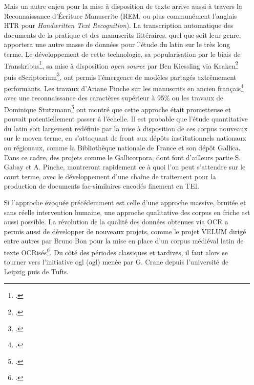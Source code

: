 Mais un autre enjeu pour la mise à disposition de texte arrive aussi à travers la Reconnaissance d'Écriture Manuscrite (REM, ou plus communément l'anglais HTR pour \textit{Handwritten Text Recognition}). La transcription automatique des documents de la pratique et des manuscrits littéraires, quel que soit leur genre, apportera une autre masse de données pour l'étude du latin sur le très long terme. Le développement de cette technologie, sa popularisation par le biais de Transkribus\footcite{kahle2017transkribus}, sa mise à disposition \textit{open source} par Ben Kiessling via Kraken\footcite{kiessling2019kraken} puis eScriptorium\footcite{kiessling_escripto}, ont permis l'émergence de modèles partagés extrêmement performants. Les travaux d'Ariane Pinche sur les manuscrits en ancien français\footcite{Pinche_CREMMA_Medieval_an_2021} avec une reconnaissance des caractères supérieur à 95\% ou les travaux de Dominique Stutzmann\footcite{hazem2020books} ont montré que cette approche était prometteuse et pouvait potentiellement passer à l'échelle. Il est probable que l'étude quantitative du latin soit largement redéfinie par la mise à disposition de ces corpus nouveaux sur le moyen terme, en s'attaquant de front aux dépôts institutionnels nationaux ou régionaux, comme la Bibliothèque nationale de France et son dépôt Gallica. Dans ce cadre, des projets comme le Gallicorpora, dont font d'ailleurs partie S. Gabay et A. Pinche, montreront rapidement ce à quoi l'on peut s'attendre sur le court terme, avec le développement d'une chaîne de traitement pour la production de documents fac-similaires encodés finement en TEI.

Si l'approche évoquée précédemment est celle d'une approche massive, bruitée et sans réelle intervention humaine, une approche qualitative des corpus en friche est aussi possible. La révolution de la qualité des données obtenues via OCR a permis aussi de développer de nouveaux projets, comme le projet VELUM dirigé entre autres par Bruno Bon pour la mise en place d'un corpus médiéval latin de texte OCRisés\footcite{bon2019challenges}. Du côté des périodes classiques et tardives, il faut alors se tourner vers l'initiative \acrfull{ogl} (\acrshort{ogl}) menée par G. Crane depuis l'université de Leipzig puis de Tufts.

